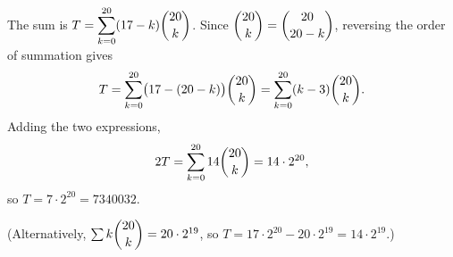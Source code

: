 The sum is $T=\displaystyle\sum_{k=0}^{20}(17-k)\dbinom{20}{k}$. Since $\dbinom{20}{k}=\dbinom{20}{20-k}$, reversing the order of summation gives
\[T=\sum_{k=0}^{20}\bigl(17-(20-k)\bigr)\dbinom{20}{k}=\sum_{k=0}^{20}(k-3)\dbinom{20}{k}.\]
Adding the two expressions,
\[2T=\sum_{k=0}^{20}14\dbinom{20}{k}=14\cdot2^{20},\]
so $T=7\cdot2^{20}=\boxed{7340032}$.

(Alternatively, $\sum k\dbinom{20}{k}=20\cdot2^{19}$, so $T=17\cdot2^{20}-20\cdot2^{19}=14\cdot2^{19}$.)
